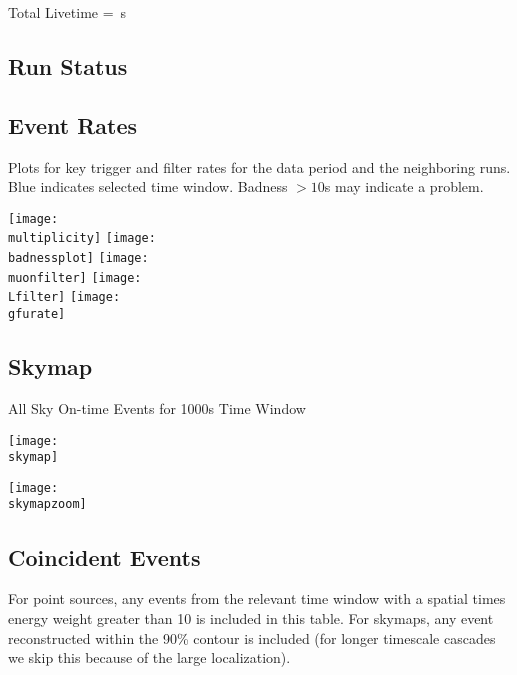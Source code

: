 \documentclass[titlepage]{article}
\begin{document}
Total Livetime = \livetime\,s

\subsection{Run Status}
\runstatustable

\pagebreak
\subsection{Event Rates}
Plots for key trigger and filter rates for the data period
and the neighboring runs.  Blue indicates selected time window.
Badness $>10$s may indicate a problem.

\vspace{1em}
{
 \centering
 \texttt{[image: \\multiplicity]}
 \texttt{[image: \\badnessplot]}
 \texttt{[image: \\muonfilter]}
 \texttt{[image: \\Lfilter]}
 \texttt{[image: \\gfurate]}
}


%
%
%
%
%
%
%

\pagebreak
\subsection{Skymap}

{
  \centering
  {\Large All Sky On-time Events for 1000s Time Window}

  \texttt{[image: \\skymap]}

  \texttt{[image: \\skymapzoom]}

}
\pagebreak

\subsection{Coincident Events}
For point sources, any events from the relevant time window with a spatial times energy weight greater than 10 is included in this table. For skymaps, any event reconstructed within the 90\% contour is included (for longer timescale cascades we skip this because of the large localization).
\event
\end{document}
